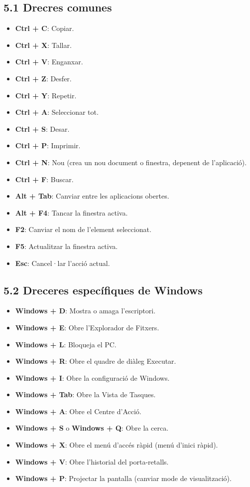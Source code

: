 \documentclass[
  a4paper,
]{article}
\providecommand{\tightlist}{%
  \setlength{\itemsep}{0pt}\setlength{\parskip}{0pt}}
\begin{document}
\subsection{5.1 Drecres comunes}\label{drecres-comunes}

\begin{itemize}
\tightlist
\item
  \textbf{Ctrl + C}: Copiar.
\item
  \textbf{Ctrl + X}: Tallar.
\item
  \textbf{Ctrl + V}: Enganxar.
\item
  \textbf{Ctrl + Z}: Desfer.
\item
  \textbf{Ctrl + Y}: Repetir.
\item
  \textbf{Ctrl + A}: Seleccionar tot.
\item
  \textbf{Ctrl + S}: Desar.
\item
  \textbf{Ctrl + P}: Imprimir.
\item
  \textbf{Ctrl + N}: Nou (crea un nou document o finestra, depenent de
  l'aplicació).
\item
  \textbf{Ctrl + F}: Buscar.
\item
  \textbf{Alt + Tab}: Canviar entre les aplicacions obertes.
\item
  \textbf{Alt + F4}: Tancar la finestra activa.
\item
  \textbf{F2}: Canviar el nom de l'element seleccionat.
\item
  \textbf{F5}: Actualitzar la finestra activa.
\item
  \textbf{Esc}: Cancel·lar l'acció actual.
\end{itemize}

\subsection{5.2 Dreceres específiques de
Windows}\label{dreceres-especuxedfiques-de-windows}

\begin{itemize}
\tightlist
\item
  \textbf{Windows + D}: Mostra o amaga l'escriptori.
\item
  \textbf{Windows + E}: Obre l'Explorador de Fitxers.
\item
  \textbf{Windows + L}: Bloqueja el PC.
\item
  \textbf{Windows + R}: Obre el quadre de diàleg Executar.
\item
  \textbf{Windows + I}: Obre la configuració de Windows.
\item
  \textbf{Windows + Tab}: Obre la Vista de Tasques.
\item
  \textbf{Windows + A}: Obre el Centre d'Acció.
\item
  \textbf{Windows + S} o \textbf{Windows + Q}: Obre la cerca.
\item
  \textbf{Windows + X}: Obre el menú d'accés ràpid (menú d'inici ràpid).
\item
  \textbf{Windows + V}: Obre l'historial del porta-retalls.
\item
  \textbf{Windows + P}: Projectar la pantalla (canviar mode de
  visualització).
\end{itemize}
\end{document}
